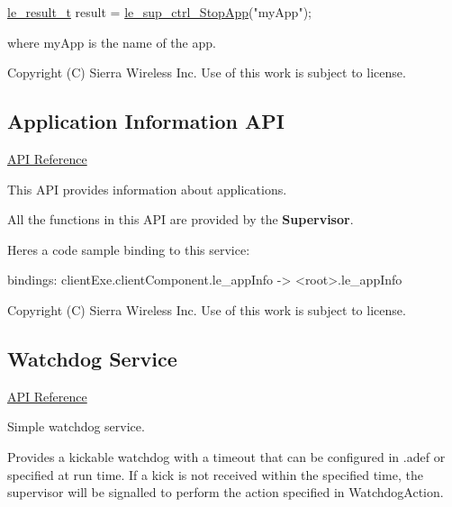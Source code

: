 \begin{DoxyCode}
\hyperlink{le__basics_8h_a1cca095ed6ebab24b57a636382a6c86c}{le\_result\_t} result = \hyperlink{le__sup__ctrl__interface_8h_a468918cc7037de4641666cfa948f7216}{le\_sup\_ctrl\_StopApp}(\textcolor{stringliteral}{"myApp"});
\end{DoxyCode}


where {\ttfamily my\+App} is the name of the app.





Copyright (C) Sierra Wireless Inc. Use of this work is subject to license. \hypertarget{c_appInfo}{}\subsection{Application Information A\+P\+I}\label{c_appInfo}
\hyperlink{le__app_info__interface_8h}{A\+P\+I Reference}

This A\+P\+I provides information about applications.

All the functions in this A\+P\+I are provided by the {\bfseries Supervisor}.

Here\textquotesingle{}s a code sample binding to this service\+: \begin{DoxyVerb}bindings:
{
   clientExe.clientComponent.le_appInfo -> <root>.le_appInfo
}
\end{DoxyVerb}






Copyright (C) Sierra Wireless Inc. Use of this work is subject to license. \hypertarget{c_wdog}{}\subsection{Watchdog Service}\label{c_wdog}
\hyperlink{le__wdog__interface_8h}{A\+P\+I Reference}





Simple watchdog service.

Provides a kickable watchdog with a timeout that can be configured in {\ttfamily  .adef} or specified at run time. If a kick is not received within the specified time, the supervisor will be signalled to perform the action specified in Watchdog\+Action.





